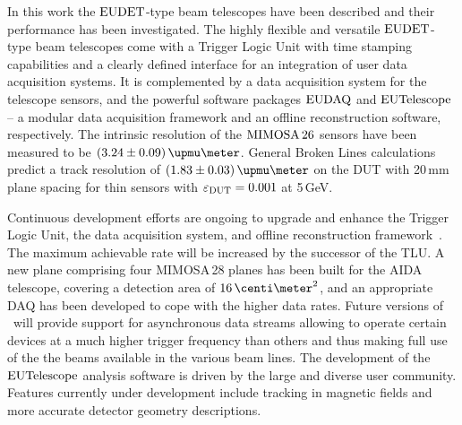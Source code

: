 

In this work the $\textrm{EUDET}$-type beam telescopes have been described and their performance has been investigated. 
The highly flexible and versatile $\textrm{EUDET}$-type beam telescopes come with a Trigger Logic Unit with time stamping capabilities and a clearly defined interface for an integration of user data acquisition systems.
It is complemented by a data acquisition system for the telescope sensors, and the powerful software packages $\textrm{EUDAQ}$ and $\textrm{EUTelescope}$
 --  a modular data acquisition framework and an offline reconstruction software, respectively. 
The intrinsic resolution of the $\textrm{MIMOSA\,26}$ sensors have been measured to be $(3.24 \pm 0.09)\,\upmu\meter$.
General Broken Lines calculations predict a track resolution of $(1.83 \pm 0.03)\,\upmu\meter$ on the DUT with 20\,mm plane spacing for thin sensors with $\mathnormal{\varepsilon_{\textrm{DUT}}} = 0.001$ at 5\,GeV. 

Continuous development efforts are ongoing to upgrade and enhance the Trigger Logic Unit, the data acquisition system, and offline reconstruction framework~\cite{ref:tipp2014_eudaq}.  
The maximum achievable rate will be increased by the successor of the TLU. 
A new plane comprising four MIMOSA\,28 planes has been built for the AIDA telescope, covering a detection area of $16\,\centi\meter^2$, and an appropriate DAQ has been developed to cope with the higher data rates. 
Future versions of \eudaq\ will provide support for asynchronous data streams allowing to operate certain devices at a much higher trigger frequency than others
 and thus making full use of the the beams available in the various beam lines.
The development of the $\textrm{EUTelescope}$ analysis software is driven by the large and diverse user community. 
Features currently under development include tracking in magnetic fields and more accurate detector geometry descriptions. 
